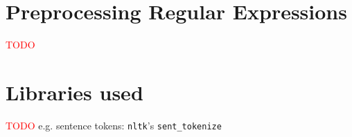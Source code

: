 \section{Preprocessing Regular Expressions}
\label{app:regex_preproc}

\textcolor{red}{TODO}





\section{Libraries used}
\label{app:libraries}

\textcolor{red}{TODO}
e.g. sentence tokens: \texttt{nltk}'s \texttt{sent\_tokenize}